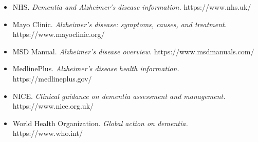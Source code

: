 \begin{itemize}
    \item NHS. \textit{Dementia and Alzheimer's disease information.} https://www.nhs.uk/
    \item Mayo Clinic. \textit{Alzheimer's disease: symptoms, causes, and treatment.} https://www.mayoclinic.org/
    \item MSD Manual. \textit{Alzheimer's disease overview.} https://www.msdmanuals.com/
    \item MedlinePlus. \textit{Alzheimer's disease health information.} https://medlineplus.gov/
    \item NICE. \textit{Clinical guidance on dementia assessment and management.} https://www.nice.org.uk/
    \item World Health Organization. \textit{Global action on dementia.} https://www.who.int/
\end{itemize}
